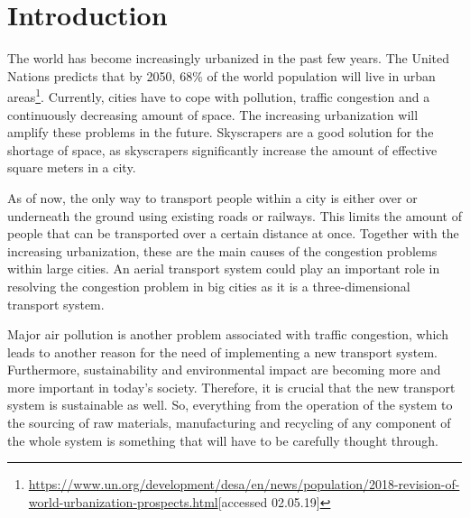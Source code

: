\newpage
\chapter*{\vspace{-10mm}Introduction}

The world has become increasingly urbanized in the past few years. The United Nations predicts that by 2050, 68\% of the world population will live in urban areas\footnote{\url{https://www.un.org/development/desa/en/news/population/2018-revision-of-world-urbanization-prospects.html}[accessed 02.05.19]}. Currently, cities have to cope with pollution, traffic congestion and a continuously decreasing amount of space. The increasing urbanization will amplify these problems in the future. Skyscrapers are a good solution for the shortage of space, as skyscrapers significantly increase the amount of effective square meters in a city.

As of now, the only way to transport people within a city is either over or underneath the ground using existing roads or railways. This limits the amount of people that can be transported over a certain distance at once. Together with the increasing urbanization, these are the main causes of the congestion problems within large cities. An aerial transport system could play an important role in resolving the congestion problem in big cities as it is a three-dimensional transport system. 


Major air pollution is another problem associated with traffic congestion, which leads to another reason for the need of implementing a new transport system. Furthermore, sustainability and environmental impact are becoming more and more important in today's society. Therefore, it is crucial that the new transport system is sustainable as well. So, everything from the operation of the system to the sourcing of raw materials, manufacturing and recycling of any component of the whole system is something that will have to be carefully thought through.

